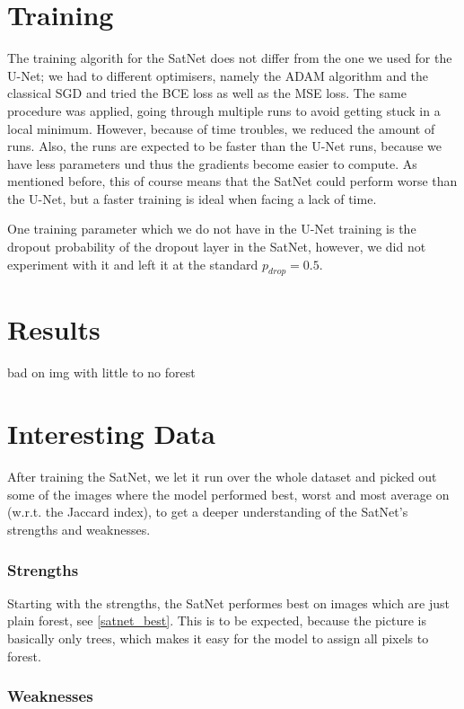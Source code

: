 \section{Training}
The training algorith for the SatNet does not differ from the one we used for the U-Net; we had to different optimisers, namely the ADAM algorithm and the classical SGD and tried the BCE loss as well as the MSE loss. The same procedure was applied, going through multiple runs to avoid getting stuck in a local minimum. However, because of time troubles, we reduced the amount of runs. Also, the runs are expected to be faster than the U-Net runs, because we have less parameters und thus the gradients become easier to compute. As mentioned before, this of course means that the SatNet could perform worse than the U-Net, but a faster training is ideal when facing a lack of time.

One training parameter which we do not have in the U-Net training is the dropout probability of the dropout layer in the SatNet, however, we did not experiment with it and left it at the standard $p_{drop}=0.5$. \\

\section{Results}
bad on img with little to no forest\\

\section{Interesting Data}

After training the SatNet, we let it run over the whole dataset and picked out some of the images where the model performed best, worst and most average on (w.r.t. the Jaccard index), to get a deeper understanding of the SatNet's strengths and weaknesses.

\subsubsection{Strengths}

Starting with the strengths, the SatNet performes best on images which are just plain forest, see \ref{satnet_best}. This is to be expected, because the picture is basically only trees, which makes it easy for the model to assign all pixels to forest.

\subsubsection{Weaknesses}

